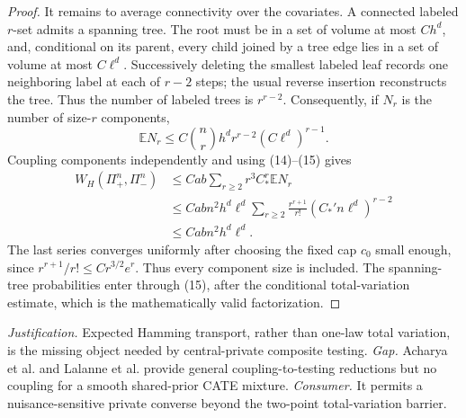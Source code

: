 \documentclass{article}
\begin{document}
\begin{proof}
It remains to average connectivity over the covariates.  A connected labeled \(r\)-set admits a spanning tree.  The root must be in a set of volume at most \(Ch^d\), and, conditional on its parent, every child joined by a tree edge lies in a set of volume at most \(C\ell^d\).  Successively deleting the smallest labeled leaf records one neighboring label at each of \(r-2\) steps; the usual reverse insertion reconstructs the tree.  Thus the number of labeled trees is \(r^{r-2}\).  Consequently, if \(N_r\) is the number of size-\(r\) components,
\[
 \mathbb E N_r\le C{n\choose r}h^d r^{r-2}(C\ell^d)^{r-1}. \tag{15}
\]
Coupling components independently and using (14)--(15) gives
\[
 \begin{aligned}
 W_H(\Pi_+^n,\Pi_-^n)
 &\le Cab\sum_{r\ge2}r^3C_*^r\mathbb E N_r\\
 &\le Cabn^2h^d\ell^d
 \sum_{r\ge2}\frac{r^{r+1}}{r!}
       (C_*'n\ell^d)^{r-2}\\
 &\le Cabn^2h^d\ell^d.
 \end{aligned}
\]
The last series converges uniformly after choosing the fixed cap \(c_0\) small enough, since \(r^{r+1}/r!\le C r^{3/2}e^r\).  Thus every component size is included.  The spanning-tree probabilities enter through (15), after the conditional total-variation estimate, which is the mathematically valid factorization.
\end{proof}
\par\smallskip\noindent \textit{Justification.} Expected Hamming transport, rather than one-law total variation, is the missing object needed by central-private composite testing. \textit{Gap.} Acharya et al. and Lalanne et al. provide general coupling-to-testing reductions but no coupling for a smooth shared-prior CATE mixture. \textit{Consumer.} It permits a nuisance-sensitive private converse beyond the two-point total-variation barrier.
\end{document}
